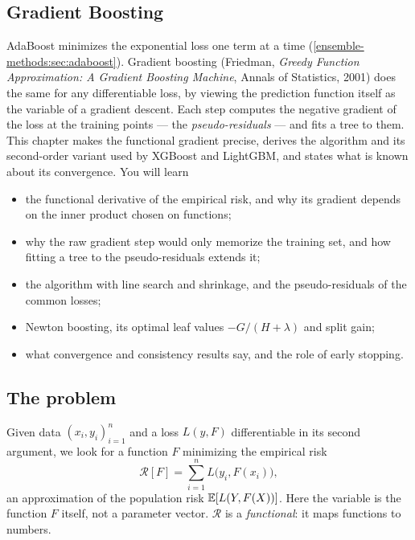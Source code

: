 \begin{notechapter}
\chapter{Gradient Boosting}\label{ch:gradient-boosting}

\begin{chapterintro}
AdaBoost minimizes the exponential loss one term at a time
(\cref{ensemble-methods:sec:adaboost}). Gradient boosting (Friedman, \emph{Greedy Function
Approximation: A Gradient Boosting Machine}, Annals of Statistics, 2001) does the same
for any differentiable loss, by viewing the prediction function itself as the variable
of a gradient descent. Each step computes the negative gradient of the loss at the
training points --- the \emph{pseudo-residuals} --- and fits a tree to them. This
chapter makes the functional gradient precise, derives the algorithm and its
second-order variant used by XGBoost and LightGBM, and states what is known about its
convergence. You will learn
\begin{itemize}[nosep]
  \item the functional derivative of the empirical risk, and why its gradient depends on the
        inner product chosen on functions;
  \item why the raw gradient step would only memorize the training set, and how fitting a
        tree to the pseudo-residuals extends it;
  \item the algorithm with line search and shrinkage, and the pseudo-residuals of the
        common losses;
  \item Newton boosting, its optimal leaf values $-G/(H + \lambda)$ and split gain;
  \item what convergence and consistency results say, and the role of early stopping.
\end{itemize}
\end{chapterintro}

\section{The problem}\label{gradient-boosting:sec:problem}

Given data $(x_i, y_i)_{i=1}^n$ and a loss $L(y, F)$ differentiable in its second argument, we look
for a function $F$ minimizing the empirical risk
\[
  \mathcal R[F] = \sum_{i=1}^nL\bigl(y_i, F(x_i)\bigr),
\]
an approximation of the population risk $\mathbb{E}[L(Y, F(X))]$. Here the variable is the function $F$
itself, not a parameter vector. $\mathcal R$ is a \emph{functional}: it maps functions to numbers.


\end{notechapter}
